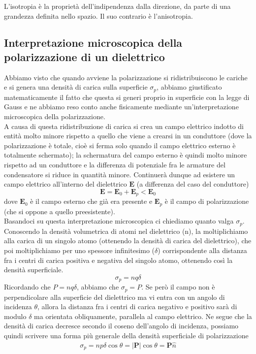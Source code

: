 \documentclass[
10pt, %
a4paper, %
oneside, %
headinclude,footinclude, %
BCOR5mm, %
]{scrartcl}
\begin{document}
\begin{definizione}[Isotropia]
	L'isotropia è la proprietà dell'indipendenza dalla direzione, da parte di una grandezza definita nello spazio. Il suo contrario è l'anisotropia.
\end{definizione}
\subsection{Interpretazione microscopica della polarizzazione di un dielettrico}
Abbiamo visto che quando avviene la polarizzazione si ridistribuiscono le cariche e si genera una densità di carica sulla superficie \(\sigma_p\), abbiamo giustificato matematicamente il fatto che questa si generi proprio in superficie con la legge di Gauss e ne abbiamo reso conto anche fisicamente mediante un'interpretazione microscopica della polarizzazione.\\
A causa di questa ridistribuzione di carica si crea un campo elettrico indotto di entità molto minore rispetto a quello che viene a crearsi in un conduttore (dove la polarizzazione è totale, cioè si ferma solo quando il campo elettrico esterno è totalmente schermato); la schermatura del campo esterno è quindi molto minore rispetto ad un conduttore e la differenza di potenziale fra le armature del condensatore si riduce in quantità minore. Continuerà dunque ad esistere un campo elettrico all'interno del dielettrico $\mathbf{E}$ (a differenza del caso del conduttore)
\[\mathbf{E} = \mathbf{E}_0+\mathbf{E}_p<\mathbf{E}_0\]
dove $\mathbf{E}_0$ è il campo esterno che già era presente e $\mathbf{E}_p$ è il campo di polarizzazione (che si oppone a quello preesistente).\\
Basandoci su questa interpretazione microscopica ci chiediamo quanto valga $\sigma_p$. Conoscendo la densità volumetrica di atomi nel dielettrico (n), la moltiplichiamo alla carica di un singolo atomo (ottenendo la densità di carica del dielettrico), che poi moltiplichiamo per uno spessore infinitesimo (\(\delta\)) corrispondente alla distanza fra i centri di carica positiva e negativa del singolo atomo, ottenendo così la densità superficiale.
\[\sigma_p = n q \delta\]
Ricordando che \(P = nq\delta\), abbiamo che $\sigma_p = P$. Se però il campo non è perpendicolare alla superficie del dielettrico ma vi entra con un angolo di incidenza $\theta$, allora la distanza fra i centri di carica negativo e positivo sarà di modulo $\delta$ ma orientata obliquamente, parallela al campo elettrico. Ne segue che la densità di carica decresce secondo il coseno dell'angolo di incidenza, possiamo quindi scrivere una forma più generale della densità superficiale di polarizzazione
\begin{align}\label{eq:densità_polarizzazione}
	\sigma_p = np\delta \cos\theta= |\mathbf{P}|\cos\theta = \mathbf{P}\hat{n}
\end{align}
\end{document}
